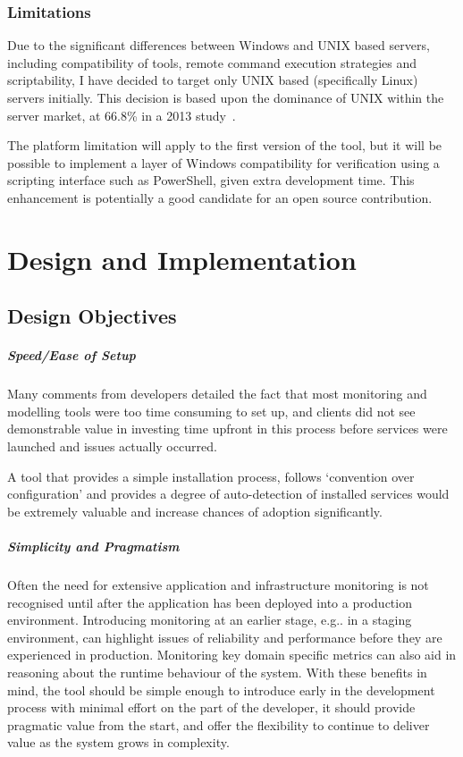 \documentclass{cshonours}
\begin{document}
\subsection{Limitations}

Due to the significant differences between Windows and UNIX based servers, including compatibility of tools, remote command execution strategies and scriptability, I have decided to target only UNIX based (specifically Linux) servers initially. This decision is based upon the dominance of UNIX within the server market, at 66.8\% in a 2013 study~\cite{UnixMarketShare}.

The platform limitation will apply to the first version of the tool, but it will be possible to implement a layer of Windows compatibility for verification using a scripting interface such as PowerShell, given extra development time. This enhancement is potentially a good candidate for an open source contribution.

\chapter{Design and Implementation}

\section{Design Objectives}

\paragraph{Speed/Ease of Setup} Many comments from developers detailed the fact that most monitoring and modelling tools were too time consuming to set up, and clients did not see demonstrable value in investing time upfront in this process before services were launched and issues actually occurred. 

A tool that provides a simple installation process, follows ‘convention over configuration’ and provides a degree of auto-detection of installed services would be extremely valuable and increase chances of adoption significantly.

\paragraph{Simplicity and Pragmatism} Often the need for extensive application and infrastructure monitoring is not recognised until after the application has been deployed into a production environment. Introducing monitoring at an earlier stage, e.g.. in a staging environment, can highlight issues of reliability and performance before they are experienced in production. Monitoring key domain specific metrics can also aid in reasoning about the runtime behaviour of the system. With these benefits in mind, the tool should be simple enough to introduce early in the development process with minimal effort on the part of the developer, it should provide pragmatic value from the start, and offer the flexibility to continue to deliver value as the system grows in complexity.
\end{document}
